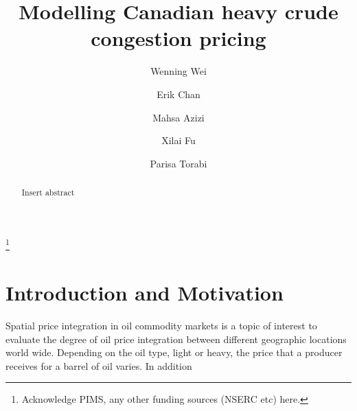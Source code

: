 \documentclass[11pt]{m2pi}
\begin{document}
\title{Modelling Canadian heavy crude congestion pricing}

\author{Wenning Wei}
\address{University of Calgary, Dept. of Math. and Stat.
2500 University Drive NW, Calgary AB, T2N 1N4, Canada}

\author{Erik Chan}
\address{University of Calgary, Dept. of Math. and Stat.
2500 University Drive NW, Calgary AB, T2N 1N4, Canada}


\author{Mahsa Azizi}
\address{}
\email{}

\author{Xilai Fu}
\address{}
\email{}

\author{Parisa Torabi}
\address{}
\email{}


\thanks{Acknowledge PIMS, any other funding sources (NSERC etc) here.}

\begin{abstract}
Insert abstract
\end{abstract}


\maketitle

\section{Introduction and Motivation}
Spatial price integration in oil commodity markets is a topic of interest to evaluate the degree of oil price integration between different geographic locations world wide. Depending on the oil type, light or heavy, the price that a producer receives for a barrel of oil varies. In addition  \cite{Zhu2020}
\end{document}
